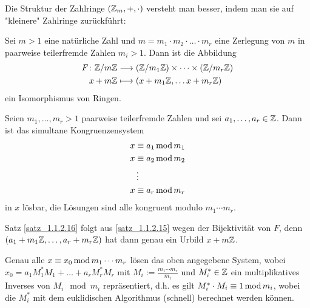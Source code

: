 Die Struktur der Zahlringe $(\mathbb{Z}_m,+,\cdot)$ versteht man besser, indem man sie auf "kleinere" Zahlringe zurückführt:

\begin{satz}
\label{satz_1.1.2.15}
	Sei $m > 1$ eine natürliche Zahl und $m = m_1 \cdot m_2 \cdot \dots \cdot m_r$ eine Zerlegung von $m$ in paarweise teilerfremde Zahlen $m_i > 1$. Dann ist die Abbildung
	\begin{equation}
	\begin{aligned}
		F\colon \mathbb{Z}/m\mathbb{Z} &\longrightarrow (\mathbb{Z}/m_1\mathbb{Z}) \times \dots \times (\mathbb{Z}/m_r \mathbb{Z}) \\
		x + m\mathbb{Z} &\longmapsto (x + m_1\mathbb{Z}, \dots x + m_r \mathbb{Z})
	\end{aligned}
	\end{equation}
	ein Isomorphismus von Ringen. 
\end{satz}

\begin{satz}
\label{satz_1.1.2.16}
	Seien $m_1, \dots, m_r > 1$ paarweise teilerfremde Zahlen und sei $a_1, \dots, a_r \in \mathbb{Z}$. Dann ist das simultane Kongruenzensystem
	\begin{equation}
	\begin{aligned}
		x &\equiv a_1 \operatorname{mod} m_1 \\
		x &\equiv a_2 \operatorname{mod} m_2 \\
		&\vdots \\
		x &\equiv a_r \operatorname{mod} m_r
	\end{aligned}
	\end{equation}
	in $x$ lösbar, die Lösungen sind alle kongruent modulo $m_1 \cdots m_r$.
\end{satz}

	Satz \ref{satz_1.1.2.16} folgt aus \ref{satz_1.1.2.15} wegen der Bijektivität von $F$, denn $(a_1+m_1\mathbb{Z}, \dots, a_r+m_r\mathbb{Z})$ hat dann genau ein Urbild $x + m\mathbb{Z}$.
	
\begin{zusatz}
\label{zusatz_1.1.2.17}
	Genau alle $x \equiv x_0 \operatorname{mod} m_1 \cdots m_r$ lösen das oben angegebene System, wobei $x_0 = a_1 M_1^* M_1 + \dots + a_r M_r^* M_r$ mit $M_i := \frac{m_1 \cdots m_r}{m_i}$ und $M_i^* \in \mathbb{Z}$ ein multiplikatives Inverses von $M_i \mod m_i$ repräsentiert, d.h. es gilt $M_i^* \cdot M_i \equiv 1 \operatorname{mod} m_i$, wobei die $M_i^*$ mit dem euklidischen Algorithmus (schnell) berechnet werden können.
\end{zusatz}

